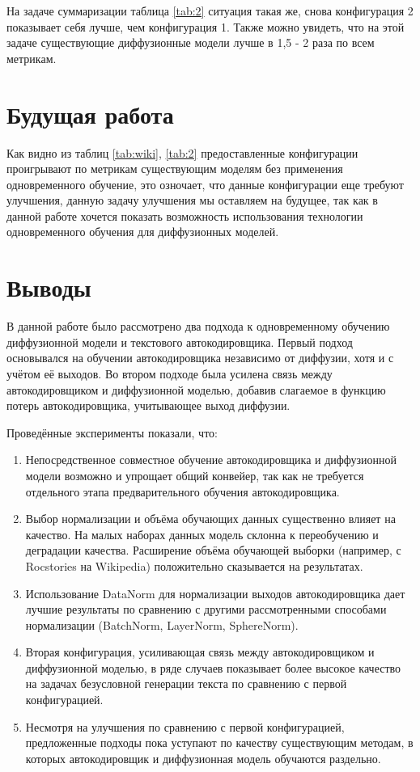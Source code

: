 \documentclass[12pt,a4paper]{article}
\begin{document}
На задаче суммаризации таблица \ref{tab:2} ситуация такая же, снова конфигурация 2 показывает себя лучше, чем конфигурация 1. Также можно увидеть, что на этой задаче существующие диффузионные модели лучше в 1,5 - 2 раза по всем метрикам. 

\section{Будущая работа}

Как видно из таблиц \ref{tab:wiki}, \ref{tab:2} предоставленные конфигурации проигрывают по метрикам существующим моделям без применения одновременного обучение, это озночает, что данные конфигурации еще требуют улучшения, данную задачу улучшения мы оставляем на будущее, так как в данной работе хочется показать возможность использования технологии одновременного обучения для диффузионных моделей.

\section{Выводы}

В данной работе было рассмотрено два подхода к одновременному обучению диффузионной модели и текстового автокодировщика. Первый подход основывался на обучении автокодировщика независимо от диффузии, хотя и с учётом её выходов. Во втором подходе была усилена связь между автокодировщиком и диффузионной моделью, добавив слагаемое в функцию потерь автокодировщика, учитывающее выход диффузии.

Проведённые эксперименты показали, что:
\begin{enumerate}
    \item Непосредственное совместное обучение автокодировщика и диффузионной модели возможно и упрощает общий конвейер, так как не требуется отдельного этапа предварительного обучения автокодировщика.
    \item Выбор нормализации и объёма обучающих данных существенно влияет на качество. На малых наборах данных модель склонна к переобучению и деградации качества. Расширение объёма обучающей выборки (например, с Rocstories на Wikipedia) положительно сказывается на результатах.
    \item Использование DataNorm для нормализации выходов автокодировщика дает лучшие результаты по сравнению с другими рассмотренными способами нормализации (BatchNorm, LayerNorm, SphereNorm).
    \item Вторая конфигурация, усиливающая связь между автокодировщиком и диффузионной моделью, в ряде случаев показывает более высокое качество на задачах безусловной генерации текста по сравнению с первой конфигурацией.
    \item Несмотря на улучшения по сравнению с первой конфигурацией, предложенные подходы пока уступают по качеству существующим методам, в которых автокодировщик и диффузионная модель обучаются раздельно.
\end{enumerate}
\end{document}
